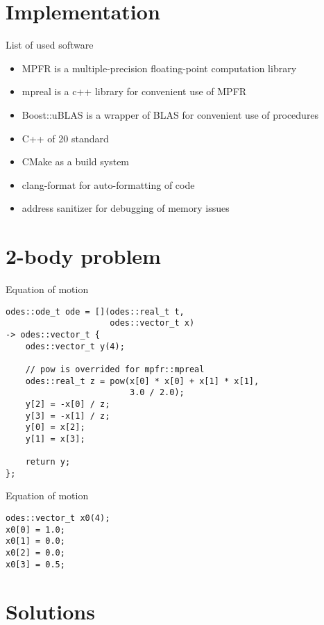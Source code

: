\documentclass[10pt]{beamer}
\begin{document}
\section{Implementation}

\begin{frame}[fragile]{List of used software}
	\begin{itemize}
        \item MPFR is a multiple-precision floating-point computation library
		\item mpreal is a c++ library for convenient use of MPFR
		\item Boost::uBLAS is a wrapper of BLAS for convenient use of procedures
		\item C++ of 20 standard
		\item CMake as a build system
        \item clang-format for auto-formatting of code
        \item address sanitizer for debugging of memory issues
	\end{itemize}
\end{frame}

\section{2-body problem}

\begin{frame}[fragile]{Equation of motion}
  \begin{verbatim}
odes::ode_t ode = [](odes::real_t t,
                     odes::vector_t x)
-> odes::vector_t {
    odes::vector_t y(4);

    // pow is overrided for mpfr::mpreal
    odes::real_t z = pow(x[0] * x[0] + x[1] * x[1],
                         3.0 / 2.0);
    y[2] = -x[0] / z;
    y[3] = -x[1] / z;
    y[0] = x[2];
    y[1] = x[3];

    return y;
};
  \end{verbatim}
\end{frame}

\begin{frame}[fragile]{Equation of motion}
  \begin{verbatim}
odes::vector_t x0(4);
x0[0] = 1.0;
x0[1] = 0.0;
x0[2] = 0.0;
x0[3] = 0.5;
  \end{verbatim}
\end{frame}

\section{Solutions}
\end{document}
